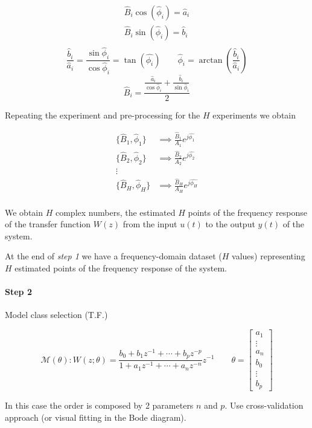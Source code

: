 \begin{align*}
    \hat{B}_i\cos(\hat{\phi}_i) = \hat{a}_i \\
    \hat{B}_i\sin(\hat{\phi}_i) = \hat{b}_i \\
\end{align*}
\[
    \frac{\hat{b}_i}{\hat{a}_i} = \frac{\sin\hat{\phi}_i}{\cos{\hat{\phi}_i}} = \tan(\hat{\phi_i}) \qquad \hat{\phi}_i = \arctan \left( \frac{\hat{b}_i}{\hat{a}_i} \right)
\]
\[
    \hat{B}_i = \frac{\frac{\hat{a}_i}{\cos\hat{\phi}_i} + \frac{\hat{b}_i}{\sin\hat{\phi}_i}}{2}
\]

Repeating the experiment and pre-processing for the $H$ experiments we obtain

\begin{align*}
    \{ \hat{B}_1, \hat{\phi}_1 \} &\implies \frac{\hat{B}_1}{A_1} e^{j\hat{\phi_1}} \\
    \{ \hat{B}_2, \hat{\phi}_2 \} &\implies \frac{\hat{B}_2}{A_2} e^{j\hat{\phi_2}} \\
    \vdots& \\
    \{ \hat{B}_H, \hat{\phi}_H \} &\implies \frac{\hat{B}_H}{A_H} e^{j\hat{\phi_H}} \\
\end{align*}

We obtain $H$ complex numbers, the estimated $H$ points of the frequency response of the transfer function $W(z)$ from the input $u(t)$ to the output $y(t)$ of the system.


At the end of \emph{step 1} we have a frequency-domain dataset ($H$ values) representing $H$ estimated points of the frequency response of the system.

\paragraph{Step 2} Model class selection (T.F.)

\[
    \mathcal{M}(\theta): W(z; \theta) = \frac{b_0+b_1z^{-1}+\cdots+b_pz^{-p}}{1+a_1z^{-1}+\cdots+a_nz^{-n}}z^{-1}
    \qquad
    \theta = \begin{bmatrix}
        a_1 \\ \vdots \\ a_n \\ b_0 \\ \vdots \\ b_p
    \end{bmatrix}
\]

\begin{remark}
    In this case the order is composed by 2 parameters $n$ and $p$.
    Use cross-validation approach (or visual fitting in the Bode diagram).
\end{remark}

